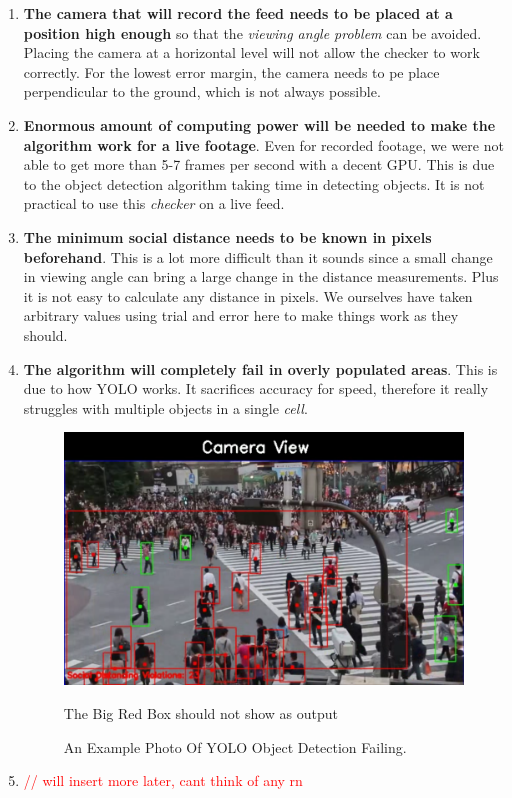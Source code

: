 \documentclass[a4paper]{article}
\begin{document}
\begin{enumerate}
    \item \textbf{The camera that will record the feed needs to be placed at a position high enough} so that the \textit{viewing angle problem} can be avoided. Placing the camera at a horizontal level will not allow the checker to work correctly. For the lowest error margin, the camera needs to pe place perpendicular to the ground, which is not always possible.
    \item \textbf{Enormous amount of computing power will be needed to make the algorithm work for a live footage}. Even for recorded footage, we were not able to get more than 5-7 frames per second with a decent GPU. This is due to the object detection algorithm taking time in detecting objects. It is not practical to use this \textit{checker} on a live feed.
    \item \textbf{The minimum social distance needs to be known in pixels beforehand}. This is a lot more difficult than it sounds since a small change in viewing angle can bring a large change in the distance measurements. Plus it is not easy to calculate any distance in pixels. We ourselves have taken arbitrary values using trial and error here to make things work as they should.
    \item \textbf{The algorithm will completely fail in overly populated areas}. This is due to how YOLO works. It sacrifices accuracy for speed, therefore it really struggles with multiple objects in a single \textit{cell}.
    \begin{figure}[h]
        \centering
        \includegraphics[width=\linewidth]{Pictures/shibuya_bad_frame.png}
        \caption{An Example Photo Of YOLO Object Detection Failing.}{The Big Red Box should not show as output}
        \label{fig5:shibuyaFail}
    \end{figure}
    \item \textcolor{red}{// will insert more later, cant think of any rn}
\end{enumerate}
\end{document}
